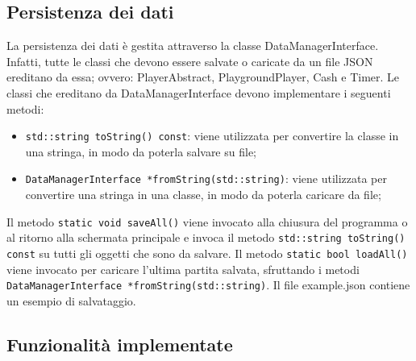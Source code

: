 \documentclass[11pt]{article}
\begin{document}
\subsection{Persistenza dei dati}

La persistenza dei dati è gestita attraverso la classe DataManagerInterface.
Infatti, tutte le classi che devono essere salvate o caricate da un file JSON
ereditano da essa; ovvero: PlayerAbstract, PlaygroundPlayer, Cash e Timer.
Le classi che ereditano da DataManagerInterface devono implementare i seguenti
metodi:
\begin{itemize}
	\item \lstinline|std::string toString() const|: viene utilizzata per 
		convertire la classe in una stringa, in modo da poterla salvare su file;

	\item \lstinline|DataManagerInterface *fromString(std::string)|: viene 
		utilizzata per convertire una stringa in una classe, in modo da poterla 
		caricare da file;
\end{itemize}

Il metodo \lstinline|static void saveAll()| viene invocato alla chiusura del 
programma o al ritorno alla schermata principale e invoca il metodo
\lstinline|std::string toString() const| su tutti
gli oggetti che sono da salvare. Il metodo \lstinline|static bool loadAll()| 
viene invocato per caricare l'ultima partita salvata, sfruttando i metodi 
\lstinline|DataManagerInterface *fromString(std::string)|. Il file example.json 
contiene un esempio di salvataggio.

\subsection{Funzionalità implementate}
\end{document}
